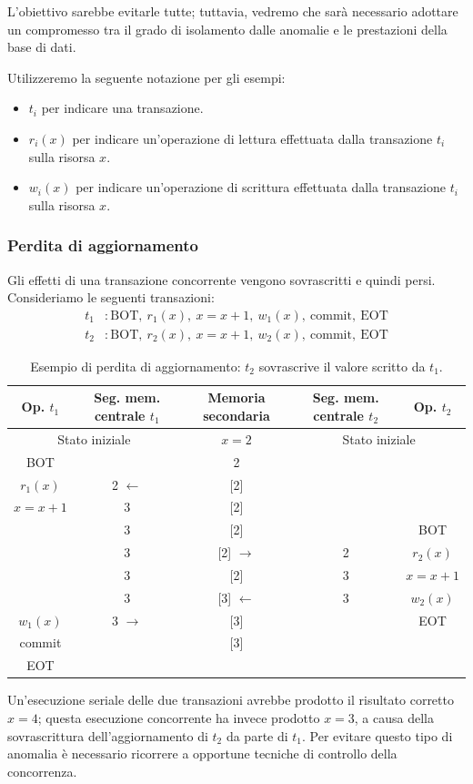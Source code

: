 L'obiettivo sarebbe evitarle tutte; tuttavia, vedremo che sarà necessario adottare un compromesso tra il grado di isolamento dalle anomalie e le prestazioni della base di dati.

Utilizzeremo la seguente notazione per gli esempi:
\begin{itemize}
	\item $t_i$ per indicare una transazione.
	\item $r_i(x)$ per indicare un'operazione di lettura effettuata dalla transazione $t_i$ sulla risorsa $x$.
	\item $w_i(x)$ per indicare un'operazione di scrittura effettuata dalla transazione $t_i$ sulla risorsa $x$.
\end{itemize}
\subsubsection{Perdita di aggiornamento}

Gli effetti di una transazione concorrente vengono sovrascritti e quindi persi. Consideriamo le seguenti transazioni:
\begin{align*}
	t_1 &: \text{BOT},\ r_1(x),\ x = x+1,\ w_1(x),\ \text{commit},\ \text{EOT} \\
	t_2 &: \text{BOT},\ r_2(x),\ x = x+1,\ w_2(x),\ \text{commit},\ \text{EOT}
\end{align*}

\begin{table}[H]
	\centering
	\begin{tabular}{|c|c|c|c|c|}
		\hline
		\textbf{Op. $t_1$} & \textbf{Seg. mem. centrale $t_1$} & \textbf{Memoria secondaria} & \textbf{Seg. mem. centrale $t_2$} & \textbf{Op. $t_2$} \\
		\hline
		\multicolumn{2}{|c|}{Stato iniziale} & $x = 2$ & \multicolumn{2}{c|}{Stato iniziale} \\
		\hline
		BOT & & 2 & & \\
		\hline
		$r_1(x)$ & 2 $\leftarrow$ & {[2]} & & \\
		\hline
		$x = x+1$ & 3 & {[2]} & & \\
		\hline
		& 3 & {[2]} & & BOT \\
		\hline
		& 3 & {[2]} $\rightarrow$ & 2 & $r_2(x)$ \\
		\hline
		& 3 & {[2]} & 3 & $x = x+1$ \\
		\hline
		& 3 & {[3]} $\leftarrow$ & 3 & $w_2(x)$ \\
		\hline
		$w_1(x)$ & 3 $\rightarrow$ & {[3]} & & EOT \\
		\hline
		commit & & {[3]} & & \\
		\hline
		EOT & & \cellcolor{green!30}{[3]} & & \\
		\hline
	\end{tabular}
	\caption{Esempio di perdita di aggiornamento: $t_2$ sovrascrive il valore scritto da $t_1$.}
\end{table}
Un'esecuzione seriale delle due transazioni avrebbe prodotto il risultato corretto $x = 4$; questa esecuzione concorrente ha invece prodotto $x = 3$, a causa della sovrascrittura dell'aggiornamento di $t_2$ da parte di $t_1$. Per evitare questo tipo di anomalia è necessario ricorrere a opportune tecniche di controllo della concorrenza.
